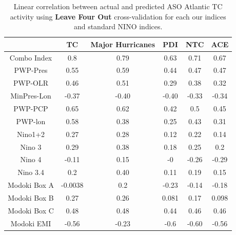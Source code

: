 \documentclass[]{article}
\begin{document}
\begin{table}
\begin{tabular}{cccccc}
\hline
&TC & Major Hurricanes & PDI & NTC & ACE\\
\hline
Combo Index & 0.8 & 0.79 & 0.63 & 0.71 & 0.67\\
PWP-Pres & 0.55 & 0.59 & 0.44 & 0.47 & 0.47\\
PWP-OLR & 0.46 & 0.51 & 0.29 & 0.38 & 0.32\\
MinPres-Lon & -0.37 & -0.40 & -0.40 & -0.33 & -0.34\\
PWP-PCP & 0.65 & 0.62 & 0.42 & 0.5 & 0.45\\
PWP-lon & 0.58 & 0.38 & 0.25 & 0.43 & 0.31\\
Nino1+2 & 0.27 & 0.28 & 0.12 & 0.22 & 0.14\\
Nino 3 & 0.29 & 0.38 & 0.18 & 0.25 & 0.2\\
Nino 4 & -0.11 & 0.15 & -0 & -0.26 & -0.29\\
Nino 3.4 & 0.2 & 0.40 & 0.11 & 0.19 & 0.15\\
Modoki Box A & -0.0038 & 0.2 & -0.23 & -0.14 & -0.18\\
Modoki Box B & 0.27 & 0.26 & 0.081 & 0.17 & 0.098\\
Modoki Box C & 0.48 & 0.48 & 0.44 & 0.46 & 0.46\\
Modoki EMI & -0.56 & -0.23 & -0.6 & -0.60 & -0.56\\
\hline
\end{tabular}
\caption{Linear correlation between actual and predicted ASO Atlantic TC activity using \textbf{Leave Four Out} cross-validation for each our indices and standard NINO indices.}
\label{ref:l4o_corr}
\end{table}
\end{document}
